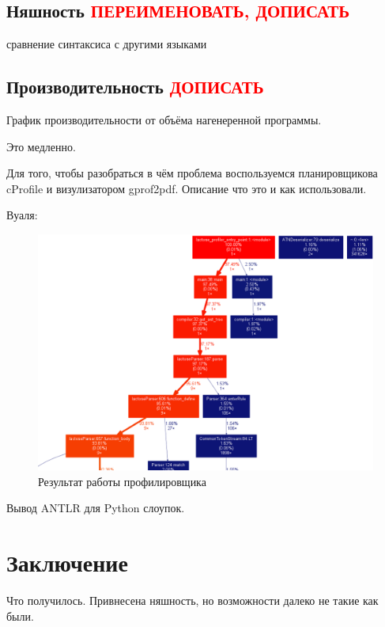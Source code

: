 \documentclass[12pt,a4paper,oneside]{extarticle}
\begin{document}
    \subsection{Няшность  \textcolor{red}{ПЕРЕИМЕНОВАТЬ, ДОПИСАТЬ}}

        сравнение синтаксиса с другими языками

    \subsection{Производительность \textcolor{red}{ДОПИСАТЬ}}

        График производительности от объёма нагенеренной программы.

        Это медленно.

        Для того, чтобы разобраться в чём проблема воспользуемся планировщикова cProfile и визулизатором gprof2pdf. 
        Описание что это и как использовали.

        Вуаля:

        \begin{figure}[h!]
            \center
            \includegraphics[scale=0.3]{lactose_stats.png}
            \caption{Результат работы профилировщика}
            \label{pic:stats}
        \end{figure}

        Вывод ANTLR для Python слоупок.
    
\clearpage

\section{Заключение}
    Что получилось. Привнесена няшность, но возможности далеко не такие как были.
\clearpage
\end{document}

